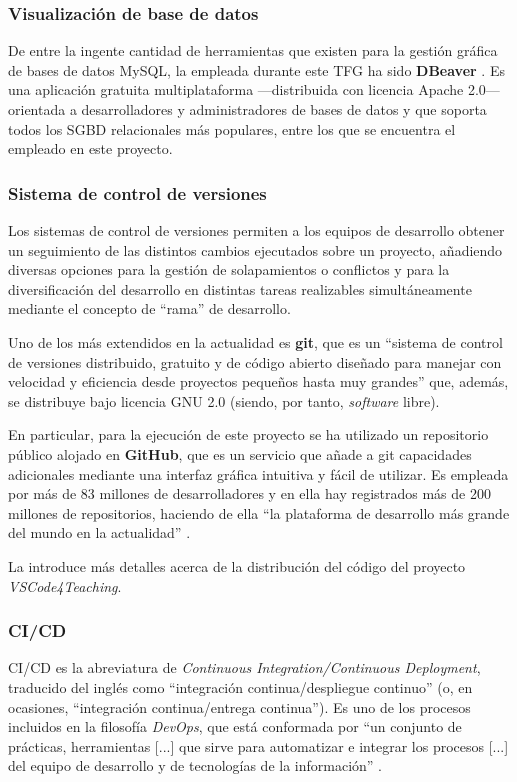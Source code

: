 \subsubsection{Visualización de base de datos}
De entre la ingente cantidad de herramientas que existen para la gestión gráfica de bases de datos MySQL, la empleada durante este TFG ha sido \textbf{DBeaver} \cite{Her_DBeaver}. Es una aplicación gratuita multiplataforma ---distribuida con licencia Apache 2.0--- orientada a desarrolladores y administradores de bases de datos y que soporta todos los SGBD relacionales más populares, entre los que se encuentra el empleado en este proyecto.

\subsubsection{Sistema de control de versiones}
\label{subsec:vcs}
Los sistemas de control de versiones permiten a los equipos de desarrollo obtener un seguimiento de las distintos cambios ejecutados sobre un proyecto, añadiendo diversas opciones para la gestión de solapamientos o conflictos y para la diversificación del desarrollo en distintas tareas realizables simultáneamente mediante el concepto de ``rama'' de desarrollo.

Uno de los más extendidos en la actualidad es \textbf{git}, que es un ``sistema de control de versiones distribuido, gratuito y de código abierto diseñado para manejar con velocidad y eficiencia desde proyectos pequeños hasta muy grandes'' \cite{Her_Git} que, además, se distribuye bajo licencia GNU 2.0 (siendo, por tanto, \textit{software} libre).

En particular, para la ejecución de este proyecto se ha utilizado un repositorio público alojado en \textbf{GitHub}, que es un servicio que añade a git capacidades adicionales mediante una interfaz gráfica intuitiva y fácil de utilizar. Es empleada por más de 83 millones de desarrolladores y en ella hay registrados más de 200 millones de repositorios, haciendo de ella ``la plataforma de desarrollo más grande del mundo en la actualidad'' \cite{Her_GitHub}.

La  introduce más detalles acerca de la distribución del código del proyecto \textit{VSCode4Teaching}.

\subsubsection{CI/CD}
\label{subsec:cicd}
CI/CD es la abreviatura de \textit{Continuous Integration/Continuous Deployment}, traducido del inglés como ``integración continua/despliegue continuo'' (o, en ocasiones, ``integración continua/entrega continua''). Es uno de los procesos incluidos en la filosofía \textit{DevOps}, que está conformada por ``un conjunto de prácticas, herramientas [...] que sirve para automatizar e integrar los procesos [...] del equipo de desarrollo y de tecnologías de la información'' \cite{Her_DevOps}.

